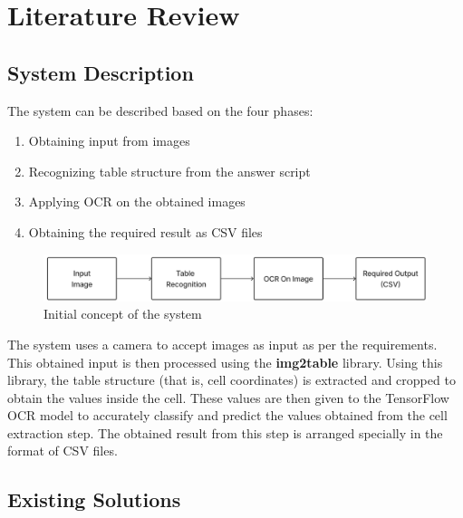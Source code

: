 \chapter{Literature Review}
 
\setcounter{equation}{0}

\section{System Description}

The system can be described based on the four phases: 
   \begin{enumerate}
        \item Obtaining input from images 
        \item Recognizing table structure from the answer script 
        \item Applying OCR on the obtained images
	\item Obtaining the required result as CSV files
    \end{enumerate}

\begin{figure}[h!]
    \centering
    \includegraphics[width=1\textwidth]{Images/lit_review/Initial concept of our system.jpg}
    \caption{Initial concept of the system}
\end{figure}

\noindent The system uses a camera to accept images as input as per the requirements. This obtained input is then processed using the \textbf{img2table} library. Using this library, the table structure (that is, cell coordinates) is extracted and cropped to obtain the values inside the cell. These values are then given to the TensorFlow OCR model to accurately classify and predict the values obtained from the cell extraction step. The obtained result from this step is arranged specially in the format of CSV files. 

\clearpage

\section{Existing Solutions}

